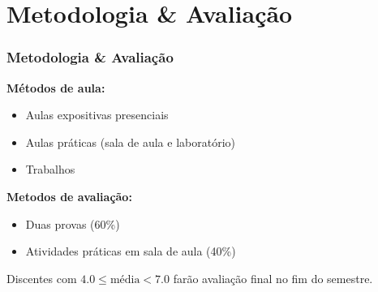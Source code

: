 \section{Metodologia \& Avaliação}
\begin{frame}
	\frametitle{Metodologia \& Avaliação}
	
	\textbf{Métodos de aula:}
	\begin{itemize}
		\item Aulas expositivas presenciais
		\item Aulas práticas (sala de aula e laboratório)
		\item Trabalhos
	\end{itemize}
	
	\vspace{10pt}

	\textbf{Metodos de avaliação:}
	\begin{itemize}
		\item Duas provas (60\%)
		\item Atividades práticas em sala de aula (40\%)
	\end{itemize}

	\vspace{10pt}
	Discentes com \(4.0 \le \mbox{média} < 7.0\) farão avaliação final no fim do semestre.
\end{frame}